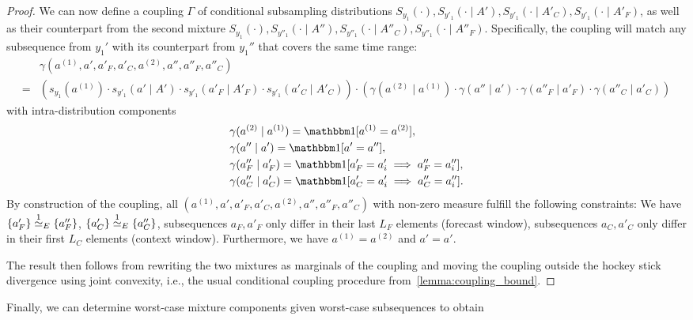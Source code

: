 \begin{proof}
    We can now define a coupling  $\Gamma$ of conditional subsampling distributions
    $S_{y_1}(\cdot), S_{y'_1}(\cdot \mid A'), S_{y'_1}(\cdot \mid A'_C), S_{y'_1}(\cdot \mid A'_F)$,
    as well as their counterpart from the second mixture 
    $S_{y_1}(\cdot), S_{y''_1}(\cdot \mid A''), S_{y''_1}(\cdot \mid A''_C), S_{y''_1}(\cdot \mid A''_F)$.
    Specifically, the coupling will match any subsequence from $y_1'$ with its counterpart from $y_1''$ that covers the same time range:
    \begin{align*}
        & \gamma(a^{(1)}, a', a'_F, a'_C, a^{(2)}, a'', a''_F, a''_C)
        \\
        = 
        &
        \left(s_{y_1}(a^{(1)}) \cdot s_{y'_1}(a' \mid A') \cdot s_{y'_1}(a'_F \mid A'_F) \cdot s_{y'_1}(a'_C \mid A'_C) \right)
        \cdot
        \left(
            \gamma(a^{(2)} \mid a^{(1)})
            \cdot
            \gamma(a'' \mid a')
            \cdot
            \gamma(a''_F \mid a'_F)
            \cdot
            \gamma(a''_C \mid a'_C)
        \right)
    \end{align*}
    with intra-distribution components 
    \begin{align*}
        & \gamma(a^{(2)} \mid a^{(1)}) = \indicator[a^{(1)} = a^{(2)}],
        \\
        & \gamma(a'' \mid a') = \indicator[a' =  a''],
        \\
        & \gamma(a''_F \mid a'_F) = \indicator[a'_F = a'_i  \implies  a''_F = a''_i],
        \\
        & \gamma(a''_C \mid a'_C) = \indicator[a'_C = a'_i  \implies  a''_C = a''_i].
    \end{align*}
    By construction of the coupling, all $(a^{(1)}, a', a'_F, a'_C, a^{(2)}, a'', a''_F, a''_C)$ with non-zero measure fulfill the following constraints:
    We have
    $\{a'_F\} \overset{1}{\simeq}_{E} \{a''_F\}$,
    $\{a'_C\} \overset{1}{\simeq}_{E} \{a''_C\}$,
    subsequences $a_F, a'_F$ only differ in their last $L_F$ elements (forecast window),
    subsequences $a_C, a'_C$ only differ in their first $L_C$ elements (context window).
    Furthermore, we have $a^{(1)} = a^{(2)}$ and $a' = a'$.

    The result then follows from rewriting the two mixtures as marginals of the coupling
    and moving the coupling outside the hockey stick divergence using joint convexity, i.e.,
    the usual conditional coupling procedure from~\cref{lemma:coupling_bound}.
\end{proof}
Finally, we can determine worst-case mixture components given worst-case subsequences to obtain
